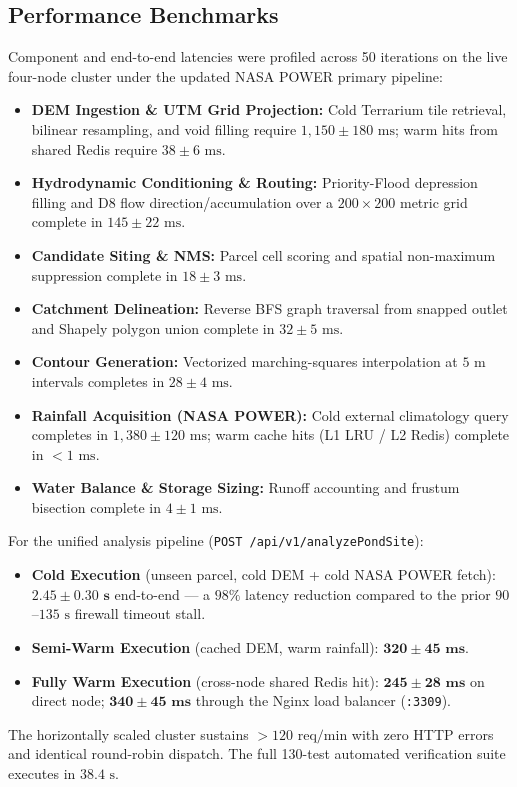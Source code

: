 \documentclass[manuscript,screen,review]{acmart}
\begin{document}
\subsection{Performance Benchmarks}
Component and end-to-end latencies were profiled across 50 iterations on the live four-node cluster under the updated NASA POWER primary pipeline:
\begin{itemize}
    \item \textbf{DEM Ingestion \& UTM Grid Projection:} Cold Terrarium tile retrieval, bilinear resampling, and void filling require $1{,}150 \pm 180\text{ ms}$; warm hits from shared Redis require $38 \pm 6\text{ ms}$.
    \item \textbf{Hydrodynamic Conditioning \& Routing:} Priority-Flood depression filling and D8 flow direction/accumulation over a $200 \times 200$ metric grid complete in $145 \pm 22\text{ ms}$.
    \item \textbf{Candidate Siting \& NMS:} Parcel cell scoring and spatial non-maximum suppression complete in $18 \pm 3\text{ ms}$.
    \item \textbf{Catchment Delineation:} Reverse BFS graph traversal from snapped outlet and Shapely polygon union complete in $32 \pm 5\text{ ms}$.
    \item \textbf{Contour Generation:} Vectorized marching-squares interpolation at $5\text{ m}$ intervals completes in $28 \pm 4\text{ ms}$.
    \item \textbf{Rainfall Acquisition (NASA POWER):} Cold external climatology query completes in $1{,}380 \pm 120\text{ ms}$; warm cache hits (L1 LRU / L2 Redis) complete in $<1\text{ ms}$.
    \item \textbf{Water Balance \& Storage Sizing:} Runoff accounting and frustum bisection complete in $4 \pm 1\text{ ms}$.
\end{itemize}

For the unified analysis pipeline (\texttt{POST /api/v1/analyzePondSite}):
\begin{itemize}
    \item \textbf{Cold Execution} (unseen parcel, cold DEM + cold NASA POWER fetch): $\mathbf{2.45 \pm 0.30\text{ s}}$ end-to-end --- a $98\%$ latency reduction compared to the prior $90$--$135\text{ s}$ firewall timeout stall.
    \item \textbf{Semi-Warm Execution} (cached DEM, warm rainfall): $\mathbf{320 \pm 45\text{ ms}}$.
    \item \textbf{Fully Warm Execution} (cross-node shared Redis hit): $\mathbf{245 \pm 28\text{ ms}}$ on direct node; $\mathbf{340 \pm 45\text{ ms}}$ through the Nginx load balancer (\texttt{:3309}).
\end{itemize}
The horizontally scaled cluster sustains $>120\text{ req/min}$ with zero HTTP errors and identical round-robin dispatch. The full 130-test automated verification suite executes in $38.4\text{ s}$.
\end{document}
